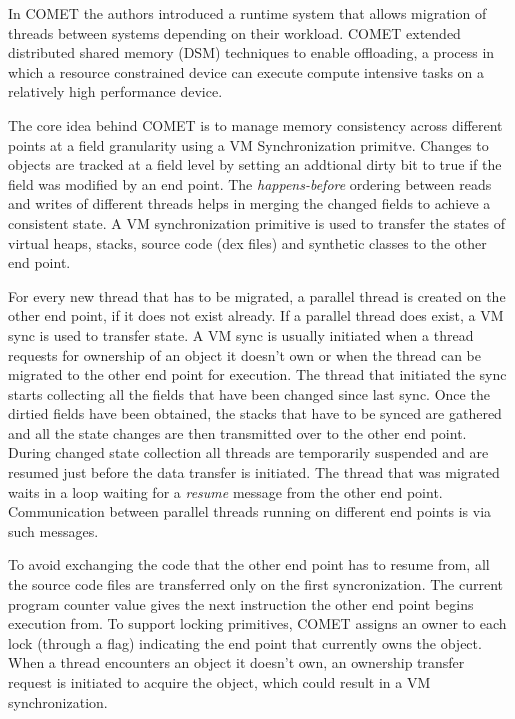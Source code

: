 In COMET the authors introduced a runtime system that allows migration of threads
between systems depending on their workload. COMET extended distributed
shared memory (DSM) techniques to enable offloading, a process in which
a resource constrained device can execute compute intensive tasks on a
relatively high performance device.

The core idea behind COMET is to manage memory consistency across different
points at a field
granularity using a VM Synchronization primitve. Changes to objects are
tracked at a field level by setting an addtional dirty bit to true if the
field was modified by an end point. The \textit{happens-before} ordering
between reads and writes of different threads helps in merging the changed
fields to achieve a consistent state. A VM synchronization primitive is used
to transfer the states of virtual heaps, stacks, source code (dex files) and
synthetic classes to the other end point.


For every new thread that has to be migrated, a parallel thread is
created on the other end point, if it does not exist already. If a parallel
thread does exist, a VM sync is used to transfer state.
A VM sync is usually initiated when a thread requests for ownership of
an object it doesn't own or when the thread can be migrated to the other
end point for execution. The thread that initiated the sync starts
collecting all the fields that have been changed since last sync. Once the
dirtied fields have been obtained, the stacks that have to be synced are
gathered and all the state changes are then transmitted over to the other
end point. During changed state collection all threads are temporarily suspended
and are resumed just before the data transfer is initiated. The thread that was
migrated waits in a loop waiting for a \textit{resume} message from the other
end point. Communication between parallel threads running on different end points
is via such messages.


To avoid exchanging
the code that the other end point has to resume from, all the source code files are
transferred only on the first syncronization. The current program counter value
gives the next instruction the other end point begins execution from. To support
locking primitives, COMET assigns an owner to each lock (through a flag)
indicating the end point that currently owns the object. When a thread
encounters an object it doesn't own, an ownership transfer request is
initiated to acquire the object, which could result in a VM synchronization.

